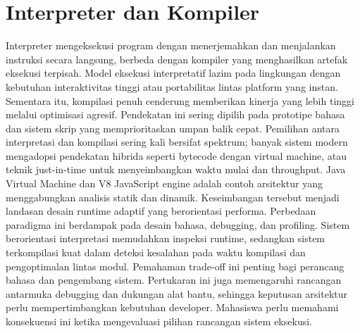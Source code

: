 \documentclass[../main.tex]{subfiles}
\begin{document}
\section{Interpreter dan Kompiler}
Interpreter mengeksekusi program dengan menerjemahkan dan menjalankan instruksi secara langsung, berbeda dengan kompiler yang menghasilkan artefak eksekusi terpisah. Model eksekusi interpretatif lazim pada lingkungan dengan kebutuhan interaktivitas tinggi atau portabilitas lintas platform yang instan. Sementara itu, kompilasi penuh cenderung memberikan kinerja yang lebih tinggi melalui optimisasi agresif.\cite{nystrom-crafting-interpreters} Pendekatan ini sering dipilih pada prototipe bahasa dan sistem skrip yang memprioritaskan umpan balik cepat.
Pemilihan antara interpretasi dan kompilasi sering kali bersifat spektrum; banyak sistem modern mengadopsi pendekatan hibrida seperti bytecode dengan virtual machine, atau teknik just-in-time untuk menyeimbangkan waktu mulai dan throughput. Java Virtual Machine dan V8 JavaScript engine adalah contoh arsitektur yang menggabungkan analisis statik dan dinamik.\cite{jvm-spec, v8-design} Keseimbangan tersebut menjadi landasan desain runtime adaptif yang berorientasi performa.
Perbedaan paradigma ini berdampak pada desain bahasa, debugging, dan profiling. Sistem berorientasi interpretasi memudahkan inspeksi runtime, sedangkan sistem terkompilasi kuat dalam deteksi kesalahan pada waktu kompilasi dan pengoptimalan lintas modul. Pemahaman trade-off ini penting bagi perancang bahasa dan pengembang sistem. Pertukaran ini juga memengaruhi rancangan antarmuka debugging dan dukungan alat bantu, sehingga keputusan arsitektur perlu mempertimbangkan kebutuhan developer. Mahasiswa perlu memahami konsekuensi ini ketika mengevaluasi pilihan rancangan sistem eksekusi.

\IfSubfilesClassLoaded{%
\printbibliography
}{}
\end{document}
